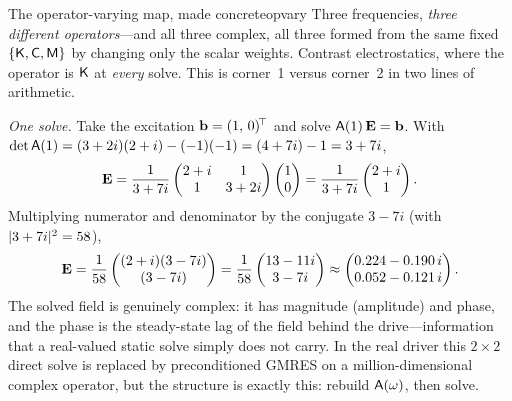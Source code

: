 \begin{workedexample}{The operator-varying map, made concrete}{opvary}
Three frequencies, \emph{three different operators}---and all three complex, all
three formed from the same fixed $\{\mathsf{K},\mathsf{C},\mathsf{M}\}$ by changing only the scalar
weights. Contrast electrostatics, where the operator is $\mathsf{K}$ at \emph{every}
solve. This is corner~1 versus corner~2 in two lines of arithmetic.

\medskip
\emph{One solve.} Take the excitation $\mathbf{b} = (1,\,0)^{\!\top}$ and solve
$\mathsf{A}(1)\,\mathbf{E} = \mathbf{b}$. With
$\det\mathsf{A}(1) = (3+2i)(2+i) - (-1)(-1) = (4 + 7i) - 1 = 3 + 7i$,
\[
  \mathbf{E}
    = \frac{1}{3+7i}
      \begin{pmatrix} 2+i & 1 \\ 1 & 3+2i \end{pmatrix}
      \begin{pmatrix} 1 \\ 0 \end{pmatrix}
    = \frac{1}{3+7i}\begin{pmatrix} 2+i \\ 1 \end{pmatrix}.
\]
Multiplying numerator and denominator by the conjugate $3-7i$ (with
$\lvert3+7i\rvert^2 = 58$),
\[
  \mathbf{E}
    = \frac{1}{58}\begin{pmatrix} (2+i)(3-7i) \\ (3-7i) \end{pmatrix}
    = \frac{1}{58}\begin{pmatrix} 13 - 11i \\ 3 - 7i \end{pmatrix}
    \approx \begin{pmatrix} 0.224 - 0.190\,i \\ 0.052 - 0.121\,i \end{pmatrix}.
\]
The solved field is genuinely complex: it has magnitude (amplitude) and phase, and
the phase is the steady-state lag of the field behind the drive---information that
a real-valued static solve simply does not carry. In the real driver this $2\times2$
direct solve is replaced by preconditioned GMRES on a million-dimensional complex
operator, but the structure is exactly this: rebuild $\mathsf{A}(\omega)$, then solve.
\end{workedexample}

